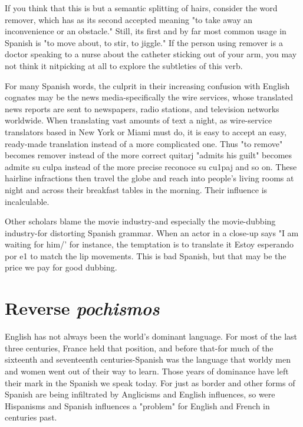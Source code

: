 If you think that this is but a semantic splitting of hairs, consider the word remover, which has as its second accepted meaning "to
take away an inconvenience or an obstacle." Still, its first and by far
most common usage in Spanish is "to move about, to stir, to jiggle."
If the person using remover is a doctor speaking to a nurse about the
catheter sticking out of your arm, you may not think it nitpicking at
all to explore the subtleties of this verb.

For many Spanish words, the culprit in their increasing confusion with English cognates may be the news media-specifically the
wire services, whose translated news reports are sent to newspapers,
radio stations, and television networks worldwide. When translating
vast amounts of text a night, as wire-service translators based in New
York or Miami must do, it is easy to accept an easy, ready-made translation instead of a more complicated one. Thus "to remove" becomes
remover instead of the more correct quitarj "admits his guilt" becomes admite su culpa instead of the more precise reconoce su cu1paj
and so on. These hairline infractions then travel the globe and reach
into people's living rooms at night and across their breakfast tables in
the morning. Their influence is incalculable.

Other scholars blame the movie industry-and especially the
movie-dubbing industry-for distorting Spanish grammar. When an
actor in a close-up says "I am waiting for him/' for instance, the temptation is to translate it Estoy esperando por e1 to match the lip movements. This is bad Spanish, but that may be the price we pay for good
dubbing.

\section{Reverse \emph{pochismos}}

English has not always been the world's dominant language.
For most of the last three centuries, France held that position, and before that-for much of the sixteenth and seventeenth centuries-Spanish was the language that worldy men and women went out of their
way to learn. Those years of dominance have left their mark in the
Spanish we speak today. For just as border and other forms of Spanish
are being infiltrated by Anglicisms and English influences, so were Hispanisms and Spanish influences a "problem" for English and French in
centuries past.

